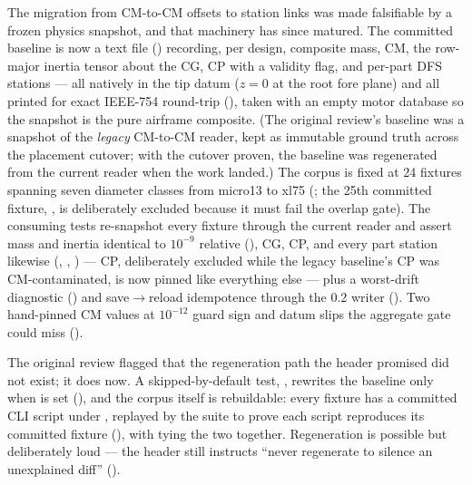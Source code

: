 The migration from CM-to-CM offsets to station links was made falsifiable by a frozen physics
snapshot, and that machinery has since matured. The committed baseline is now a 
text file () recording, per design,
composite mass, CM, the row-major inertia tensor about the CG, CP with a validity flag, and
per-part DFS stations --- all natively in the tip datum ($z=0$ at the root fore plane) and all
printed  for exact IEEE-754 round-trip
(), taken with an empty motor database so
the snapshot is the pure airframe composite. (The original review's baseline was a 
snapshot of the \emph{legacy} CM-to-CM reader, kept as immutable ground truth across the placement
cutover; with the cutover proven, the baseline was regenerated from the current reader when the
 work landed.) The corpus is fixed at 24  fixtures spanning seven
diameter classes from micro13 to xl75 (; the 25th
committed fixture, , is deliberately
excluded because it must fail the overlap gate). The consuming tests re-snapshot every fixture
through the current reader and assert mass and inertia identical to $10^{-9}$ relative
(), CG, CP, and every part station likewise
(, ,
) --- CP, deliberately excluded while the legacy
baseline's CP was CM-contaminated, is now pinned like everything else --- plus a worst-drift
diagnostic () and save$\rightarrow$reload idempotence
through the 0.2 writer (). Two hand-pinned CM values
at $10^{-12}$ guard sign and datum slips the aggregate gate could miss
().

The original review flagged that the regeneration path the header promised did not exist; it does
now. A skipped-by-default test, , rewrites the
baseline only when  is set
(), and the corpus itself is rebuildable: every
fixture has a committed CLI script under , replayed by the
 suite to prove each script reproduces its committed  fixture
(), with  tying the
two together. Regeneration is possible but deliberately loud --- the header still instructs
``never regenerate to silence an unexplained diff''
(). \fpresent

